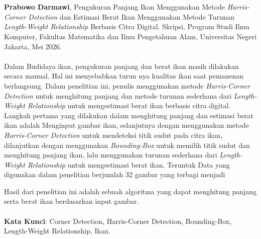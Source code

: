 \chapter*{}
\singlespacing{}

\textbf{Prabowo Darmawi}, Pengukuran Panjang Ikan  Menggunakan Metode \emph{Harris-Corner Detection} dan Estimasi Berat Ikan Menggunakan Metode Turunan \emph{Length-Weight Relationship} Berbasis Citra Digital.
Skripsi, Program Studi Ilmu Komputer, Fakultas Matematika dan Ilmu Pengetahuan Alam, Universitas Negeri Jakarta, Mei 2026.
\\
\\
    Dalam Budidaya ikan, pengukuran panjang dan berat ikan masih dilakukan secara manual. Hal ini menyebabkan turun nya kualitas ikan saat pemanenan berlangsung.
Dalam penelitian ini, penulis menggunakan metode \emph{Harris-Corner Detection} untuk menghitung panjang dan metode turunan sederhana dari \emph{Length-Weight Relationship} untuk mengestimasi berat ikan berbasis citra digital.
Langkah pertama yang dilakukan dalam menghitung panjang dan estimasi berat ikan adalah Menginput gambar ikan, selanjutnya dengan menggunakan metode \emph{Harris-Corner Detection} untuk mendeteksi titik sudut pada citra ikan, 
dilanjutkan dengan menggunakan \emph{Bounding-Box} untuk memilih titik sudut dan menghitung panjang ikan, lalu menggunakan turunan sederhana dari \emph{Length-Weight Relationship} untuk mengestimasi berat ikan. 
Teruntuk Data yang digunakan dalam penelitian berjumlah 32 gambar yang terbagi menjadi


Hasil dari penelitian ini adalah sebuah algoritma yang dapat menghitung panjang serta berat ikan berdasarkan input gambar.
\\
\\
\textbf{Kata Kunci}: Corner Detection, Harris-Corner Detection, Bounding-Box, Length-Weight Relationship, Ikan.
